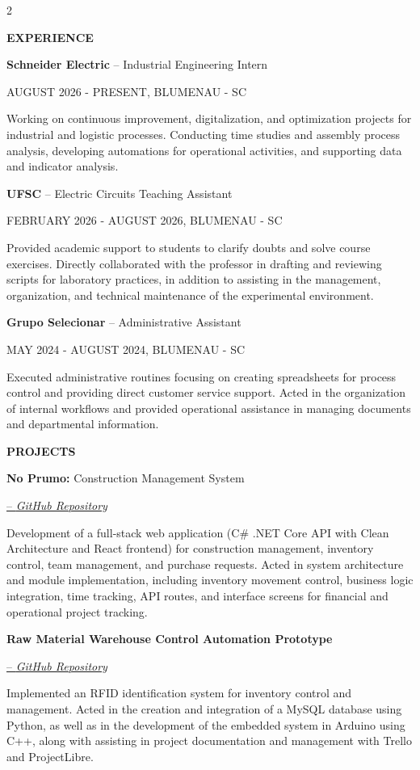 \documentclass[10pt,a4paper]{article}
\newcommand{\titulo}[1]{
    \vspace{7pt}%
    {\noindent\sffamily\bfseries\fontsize{10pt}{10pt}\selectfont\textcolor{HeadingBlue}{#1}\par}
}
\newcommand{\subtitulo}[2]{
  \vspace{7pt}%
  {\noindent\rmfamily\fontsize{11pt}{12pt}\selectfont\textcolor{TitleBlack}{\textbf{#1}\textnormal{ #2}}\par}%
}
\newcommand{\data}[1]{
  \vspace{5pt}
  {\noindent\sffamily\fontsize{8pt}{9pt}\selectfont\textcolor{BodyGrey}{#1}\par}%
}
\newcommand{\textonormal}[2]{
  \vspace{5pt}%
  {\noindent\rmfamily\fontsize{9pt}{12pt}\selectfont\textcolor{BodyGrey}{\textbf{#1} #2}\par}%
}
\newcommand{\projectlink}[2]{
  \href{#1}{-- \textcolor{LinkBlue}{\normalfont\itshape\fontsize{11pt}{12pt}\selectfont\uline{#2}}}\par
}
\newcommand{\cvsection}[1]{%
  \titulo{#1}%
}
\newcommand{\cventry}[4]{%
  \subtitulo{#1}{-- #2}
  \data{#3}
  \textonormal{}{#4}
}
\newcommand{\cvproject}[5]{%
  \begingroup
  \let\par\relax %
  \subtitulo{#1}{#2}%
  \projectlink{#3}{#4}%
  \endgroup\par %
  \textonormal{}{#5}
}
\begin{document}
\begin{paracol}{2}

\cvsection{EXPERIENCE}

\cventry{Schneider Electric}{Industrial Engineering Intern}{AUGUST 2026 - PRESENT, BLUMENAU - SC}{%
  Working on continuous improvement, digitalization, and optimization projects for industrial and logistic processes. Conducting time studies and assembly process analysis, developing automations for operational activities, and supporting data and indicator analysis.%
}

\cventry{UFSC}{Electric Circuits Teaching Assistant}{FEBRUARY 2026 - AUGUST 2026, BLUMENAU - SC}{%
  Provided academic support to students to clarify doubts and solve course exercises. Directly collaborated with the professor in drafting and reviewing scripts for laboratory practices, in addition to assisting in the management, organization, and technical maintenance of the experimental environment.%
}

\cventry{Grupo Selecionar}{Administrative Assistant}{MAY 2024 - AUGUST 2024, BLUMENAU - SC}{%
  Executed administrative routines focusing on creating spreadsheets for process control and providing direct customer service support. Acted in the organization of internal workflows and provided operational assistance in managing documents and departmental information.%
}

\cvsection{PROJECTS}

\cvproject{No Prumo:}{Construction Management System}{https://github.com/GabrielHenriqueCe/NoPrumo.git}{GitHub Repository}{%
  Development of a full-stack web application (C\# .NET Core API with Clean Architecture and React frontend) for construction management, inventory control, team management, and purchase requests. Acted in system architecture and module implementation, including inventory movement control, business logic integration, time tracking, API routes, and interface screens for financial and operational project tracking.%
}

\cvproject{Raw Material Warehouse Control Automation Prototype}{}{https://github.com/adrianfelsky/gestao-de-estoque-rfid/tree/patch-1}{GitHub Repository}{%
  Implemented an RFID identification system for inventory control and management. Acted in the creation and integration of a MySQL database using Python, as well as in the development of the embedded system in Arduino using C++, along with assisting in project documentation and management with Trello and ProjectLibre.%
}


\end{paracol}
\end{document}
